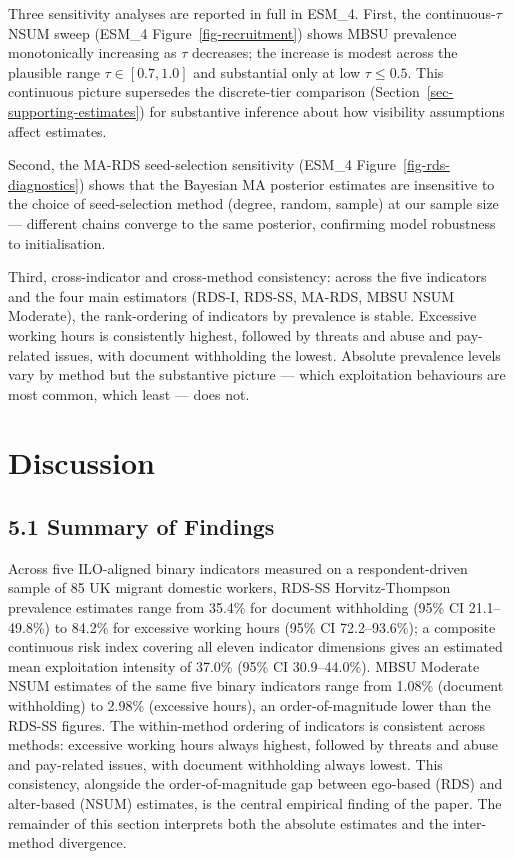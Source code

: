 \documentclass[
  12pt,
  letterpaper,
  DIV=11,
  numbers=noendperiod]{scrartcl}
\begin{document}
Three sensitivity analyses are reported in full in ESM\_4. First, the
continuous-\(\tau\) NSUM sweep (ESM\_4 Figure~\ref{fig-recruitment})
shows MBSU prevalence monotonically increasing as \(\tau\) decreases;
the increase is modest across the plausible range
\(\tau \in [0.7, 1.0]\) and substantial only at low \(\tau \le 0.5\).
This continuous picture supersedes the discrete-tier comparison
(Section~\ref{sec-supporting-estimates}) for substantive inference about
how visibility assumptions affect estimates.

Second, the MA-RDS seed-selection sensitivity (ESM\_4
Figure~\ref{fig-rds-diagnostics}) shows that the Bayesian MA posterior
estimates are insensitive to the choice of seed-selection method
(degree, random, sample) at our sample size --- different chains
converge to the same posterior, confirming model robustness to
initialisation.

Third, cross-indicator and cross-method consistency: across the five
indicators and the four main estimators (RDS-I, RDS-SS, MA-RDS, MBSU
NSUM Moderate), the rank-ordering of indicators by prevalence is stable.
Excessive working hours is consistently highest, followed by threats and
abuse and pay-related issues, with document withholding the lowest.
Absolute prevalence levels vary by method but the substantive picture
--- which exploitation behaviours are most common, which least --- does
not.

\section{Discussion}\label{sec-discussion}

\subsection{5.1 Summary of Findings}\label{sec-summary}

Across five ILO-aligned binary indicators measured on a
respondent-driven sample of 85 UK migrant domestic workers, RDS-SS
Horvitz-Thompson prevalence estimates range from 35.4\% for document
withholding (95\% CI 21.1--49.8\%) to 84.2\% for excessive working hours
(95\% CI 72.2--93.6\%); a composite continuous risk index covering all
eleven indicator dimensions gives an estimated mean exploitation
intensity of 37.0\% (95\% CI 30.9--44.0\%). MBSU Moderate NSUM estimates
of the same five binary indicators range from 1.08\% (document
withholding) to 2.98\% (excessive hours), an order-of-magnitude lower
than the RDS-SS figures. The within-method ordering of indicators is
consistent across methods: excessive working hours always highest,
followed by threats and abuse and pay-related issues, with document
withholding always lowest. This consistency, alongside the
order-of-magnitude gap between ego-based (RDS) and alter-based (NSUM)
estimates, is the central empirical finding of the paper. The remainder
of this section interprets both the absolute estimates and the
inter-method divergence.
\end{document}
